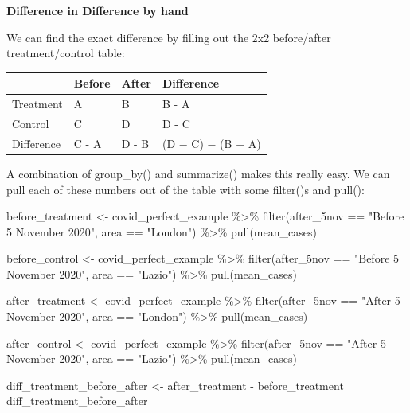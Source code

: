 \documentclass[
  letterpaper,
  DIV=11,
  numbers=noendperiod]{scrreprt}
\newenvironment{Shaded}{\begin{snugshade}}{\end{snugshade}}
\newcommand{\FunctionTok}[1]{\textcolor[rgb]{0.28,0.35,0.67}{#1}}
\newcommand{\NormalTok}[1]{\textcolor[rgb]{0.00,0.23,0.31}{#1}}
\newcommand{\OtherTok}[1]{\textcolor[rgb]{0.00,0.23,0.31}{#1}}
\newcommand{\SpecialCharTok}[1]{\textcolor[rgb]{0.37,0.37,0.37}{#1}}
\newcommand{\StringTok}[1]{\textcolor[rgb]{0.13,0.47,0.30}{#1}}
\begin{document}
\textbf{Difference in Difference by hand}

We can find the exact difference by filling out the 2x2 before/after
treatment/control table:

\begin{longtable}[]{@{}llll@{}}
\toprule\noalign{}
& Before & After & Difference \\
\midrule\noalign{}
\endhead
\bottomrule\noalign{}
\endlastfoot
Treatment & A & B & B - A \\
Control & C & D & D - C \\
Difference & C - A & D - B & (D − C) − (B − A) \\
\end{longtable}

A combination of group\_by() and summarize() makes this really easy. We
can pull each of these numbers out of the table with some filter()s and
pull():

\begin{Shaded}
\begin{Highlighting}[]
\NormalTok{before\_treatment }\OtherTok{\textless{}{-}}\NormalTok{ covid\_perfect\_example }\SpecialCharTok{\%\textgreater{}\%} 
  \FunctionTok{filter}\NormalTok{(after\_5nov }\SpecialCharTok{==} \StringTok{"Before 5 November 2020"}\NormalTok{, area }\SpecialCharTok{==} \StringTok{"London"}\NormalTok{) }\SpecialCharTok{\%\textgreater{}\%} 
  \FunctionTok{pull}\NormalTok{(mean\_cases)}

\NormalTok{before\_control }\OtherTok{\textless{}{-}}\NormalTok{ covid\_perfect\_example }\SpecialCharTok{\%\textgreater{}\%} 
  \FunctionTok{filter}\NormalTok{(after\_5nov }\SpecialCharTok{==} \StringTok{"Before 5 November 2020"}\NormalTok{, area }\SpecialCharTok{==} \StringTok{"Lazio"}\NormalTok{) }\SpecialCharTok{\%\textgreater{}\%} 
  \FunctionTok{pull}\NormalTok{(mean\_cases)}

\NormalTok{after\_treatment }\OtherTok{\textless{}{-}}\NormalTok{ covid\_perfect\_example }\SpecialCharTok{\%\textgreater{}\%} 
  \FunctionTok{filter}\NormalTok{(after\_5nov }\SpecialCharTok{==} \StringTok{"After 5 November 2020"}\NormalTok{, area }\SpecialCharTok{==} \StringTok{"London"}\NormalTok{) }\SpecialCharTok{\%\textgreater{}\%} 
  \FunctionTok{pull}\NormalTok{(mean\_cases)}

\NormalTok{after\_control }\OtherTok{\textless{}{-}}\NormalTok{ covid\_perfect\_example }\SpecialCharTok{\%\textgreater{}\%} 
  \FunctionTok{filter}\NormalTok{(after\_5nov }\SpecialCharTok{==} \StringTok{"After 5 November 2020"}\NormalTok{, area }\SpecialCharTok{==} \StringTok{"Lazio"}\NormalTok{) }\SpecialCharTok{\%\textgreater{}\%} 
  \FunctionTok{pull}\NormalTok{(mean\_cases)}

\NormalTok{diff\_treatment\_before\_after }\OtherTok{\textless{}{-}}\NormalTok{ after\_treatment }\SpecialCharTok{{-}}\NormalTok{ before\_treatment}
\NormalTok{diff\_treatment\_before\_after}
\end{Highlighting}
\end{Shaded}
\end{document}
